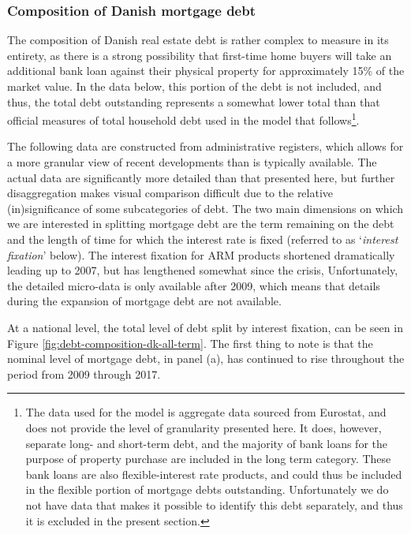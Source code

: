 \documentclass[
]{book}
\begin{document}
\hypertarget{composition-of-danish-mortgage-debt}{%
\subsubsection{Composition of Danish mortgage debt}\label{composition-of-danish-mortgage-debt}}

The composition of Danish real estate debt is rather complex to measure in its entirety,
as there is a strong possibility that first-time
home buyers will take an additional bank loan against their physical property for
approximately 15\% of the market value. In the data below, this portion of the debt
is not included, and thus, the total debt outstanding represents a somewhat lower total
than that official measures of total household debt used in the model that follows\footnote{The data used for the model is aggregate data sourced from Eurostat, and does not provide the level of granularity presented here. It does, however, separate long- and short-term debt, and the majority of bank loans for the purpose of property purchase are included in the long term category. These bank loans are also flexible-interest rate products, and could thus be included in the flexible portion of mortgage debts outstanding. Unfortunately we do not have data that makes it possible to identify this debt separately, and thus it is excluded in the present section.}.

The following data are constructed from administrative registers, which allows for a more granular view
of recent developments than is typically available. The actual data are significantly more detailed
than that presented here, but further disaggregation makes visual comparison difficult due to the relative
(in)significance of some subcategories of debt. The two main dimensions on which we are interested in
splitting mortgage debt are the term remaining on the debt and the length of time for which the interest rate
is fixed (referred to as `\emph{interest fixation}' below). The interest fixation for ARM products shortened dramatically
leading up to 2007, but has lengthened somewhat since the crisis, Unfortunately, the detailed micro-data is
only available after 2009, which means that details during the expansion of mortgage debt are not available.

At a national level, the total level of debt split by interest fixation, can be seen in Figure \ref{fig:debt-composition-dk-all-term}. The first thing to note is that the nominal level of mortgage debt, in panel (a), has continued to rise throughout the period from 2009 through 2017.
\end{document}
